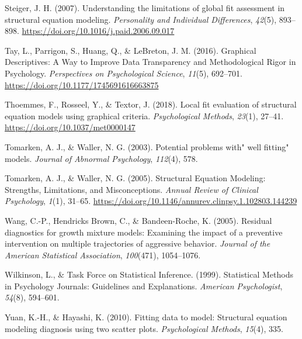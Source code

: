 \documentclass[
  english,
  doc]{apa6}
\newlength{\cslhangindent}
\newenvironment{cslreferences}%
  {\setlength{\parindent}{0pt}%
  \everypar{\setlength{\hangindent}{\cslhangindent}}\ignorespaces}%
  {\par}
\begin{document}
\begin{cslreferences}
\leavevmode\hypertarget{ref-Steiger2007}{}%
Steiger, J. H. (2007). Understanding the limitations of global fit assessment in structural equation modeling. \emph{Personality and Individual Differences}, \emph{42}(5), 893--898. \url{https://doi.org/10.1016/j.paid.2006.09.017}

\leavevmode\hypertarget{ref-Tay2016a}{}%
Tay, L., Parrigon, S., Huang, Q., \& LeBreton, J. M. (2016). Graphical Descriptives: A Way to Improve Data Transparency and Methodological Rigor in Psychology. \emph{Perspectives on Psychological Science}, \emph{11}(5), 692--701. \url{https://doi.org/10.1177/1745691616663875}

\leavevmode\hypertarget{ref-Thoemmes2018}{}%
Thoemmes, F., Rosseel, Y., \& Textor, J. (2018). Local fit evaluation of structural equation models using graphical criteria. \emph{Psychological Methods}, \emph{23}(1), 27--41. \url{https://doi.org/10.1037/met0000147}

\leavevmode\hypertarget{ref-tomarken2003potential}{}%
Tomarken, A. J., \& Waller, N. G. (2003). Potential problems with" well fitting" models. \emph{Journal of Abnormal Psychology}, \emph{112}(4), 578.

\leavevmode\hypertarget{ref-Tomarken2005}{}%
Tomarken, A. J., \& Waller, N. G. (2005). Structural Equation Modeling: Strengths, Limitations, and Misconceptions. \emph{Annual Review of Clinical Psychology}, \emph{1}(1), 31--65. \url{https://doi.org/10.1146/annurev.clinpsy.1.102803.144239}

\leavevmode\hypertarget{ref-wang2005residual}{}%
Wang, C.-P., Hendricks Brown, C., \& Bandeen-Roche, K. (2005). Residual diagnostics for growth mixture models: Examining the impact of a preventive intervention on multiple trajectories of aggressive behavior. \emph{Journal of the American Statistical Association}, \emph{100}(471), 1054--1076.

\leavevmode\hypertarget{ref-Wilkinson1999a}{}%
Wilkinson, L., \& Task Force on Statistical Inference. (1999). Statistical Methods in Psychology Journals: Guidelines and Explanations. \emph{American Psychologist}, \emph{54}(8), 594--601.

\leavevmode\hypertarget{ref-yuan2010fitting}{}%
Yuan, K.-H., \& Hayashi, K. (2010). Fitting data to model: Structural equation modeling diagnosis using two scatter plots. \emph{Psychological Methods}, \emph{15}(4), 335.
\end{cslreferences}
\end{document}
